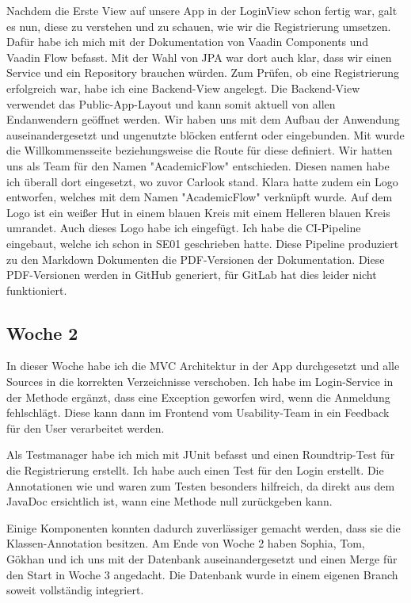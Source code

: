 Nachdem die Erste View auf unsere App in der LoginView schon fertig war, galt es nun, diese zu verstehen und zu schauen,
wie wir die Registrierung umsetzen.
Dafür habe ich mich mit der Dokumentation von Vaadin Components und Vaadin Flow befasst.
Mit der Wahl von JPA war dort auch klar, dass wir einen Service und ein Repository brauchen würden.
Zum Prüfen, ob eine Registrierung erfolgreich war, habe ich eine Backend-View angelegt.
Die Backend-View verwendet das Public-App-Layout und kann somit aktuell von allen Endanwendern
geöffnet werden.
Wir haben uns mit dem Aufbau der Anwendung auseinandergesetzt und ungenutzte blöcken entfernt oder
eingebunden.
Mit  wurde die Willkommensseite
beziehungsweise die Route für diese definiert.
Wir hatten uns als Team für den Namen "AcademicFlow" entschieden.
Diesen namen habe ich überall dort eingesetzt, wo zuvor Carlook stand.
Klara hatte zudem ein Logo entworfen, welches mit dem Namen "AcademicFlow" verknüpft wurde.
Auf dem Logo ist ein weißer Hut in einem blauen Kreis mit einem Helleren blauen
Kreis umrandet.
Auch dieses Logo habe ich eingefügt.
Ich habe die CI-Pipeline eingebaut, welche ich schon in SE01 geschrieben hatte.
Diese Pipeline produziert zu den Markdown Dokumenten die PDF-Versionen der Dokumentation.
Diese PDF-Versionen werden in GitHub generiert, für GitLab hat dies leider nicht funktioniert.

\subsection{Woche 2}\label{subsec:woche2}
In dieser Woche habe ich die MVC Architektur in der App durchgesetzt und alle Sources
in die korrekten Verzeichnisse verschoben.
Ich habe im Login-Service in der Methode  ergänzt, dass eine Exception
geworfen wird, wenn die Anmeldung fehlschlägt.
Diese kann dann im Frontend vom Usability-Team in ein Feedback für den User verarbeitet werden.

Als Testmanager habe ich mich mit JUnit befasst und einen Roundtrip-Test für die Registrierung erstellt.
Ich habe auch einen Test für den Login erstellt.
Die Annotationen wie  und 
waren zum Testen besonders hilfreich, da direkt aus dem
JavaDoc ersichtlich ist, wann eine Methode null zurückgeben kann.

Einige Komponenten konnten dadurch zuverlässiger gemacht werden, dass sie die Klassen-Annotation
 besitzen.
Am Ende von Woche 2 haben Sophia, Tom, Gökhan und ich uns mit der Datenbank auseinandergesetzt und
einen Merge für den Start in Woche 3 angedacht.
Die Datenbank wurde in einem eigenen Branch soweit vollständig integriert.

